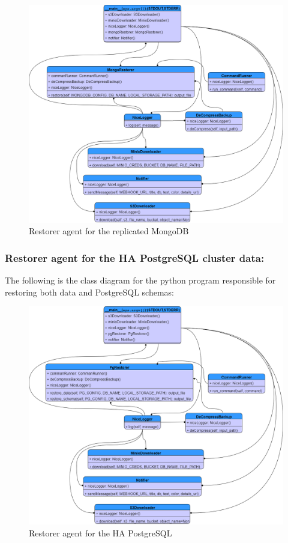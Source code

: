 \begin{figure}[H]\centering
\includegraphics[width=1.0\textwidth,angle=00]{assets/f60.png}
\caption{Restorer agent for the replicated MongoDB }
\label{fig:f60}
\end{figure}

\subsubsection{Restorer agent for the HA PostgreSQL cluster data: }

The following is the class diagram for the python program responsible for restoring both data and PostgreSQL schemas: 

\begin{figure}[H]\centering
\includegraphics[width=1.0\textwidth,angle=00]{assets/f61.png}
\caption{Restorer agent for the HA PostgreSQL }
\label{fig:f61}
\end{figure}

